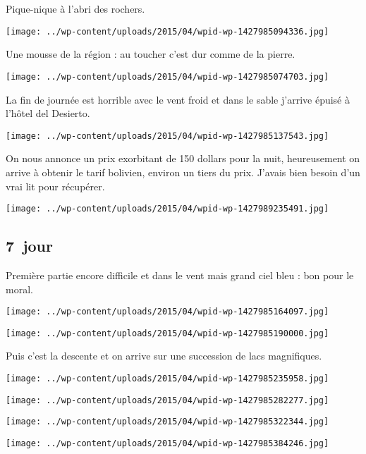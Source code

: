  Pique-nique à l'abri des rochers.
\begin{center} \texttt{[image: ../wp-content/uploads/2015/04/wpid-wp-1427985094336.jpg]} \end{center}

\pagebreak
 Une mousse de la région : au toucher c'est dur comme de la pierre.
\begin{center} \texttt{[image: ../wp-content/uploads/2015/04/wpid-wp-1427985074703.jpg]} \end{center}

 La fin de journée est horrible avec le vent froid et dans le sable j'arrive épuisé à l'hôtel del Desierto.
\begin{center} \texttt{[image: ../wp-content/uploads/2015/04/wpid-wp-1427985137543.jpg]} \end{center}

  On nous annonce un prix exorbitant de 150 dollars pour la nuit, heureusement on arrive à obtenir le tarif bolivien, environ un tiers du prix. J'avais bien besoin d'un vrai lit pour récupérer.
\begin{center} \texttt{[image: ../wp-content/uploads/2015/04/wpid-wp-1427989235491.jpg]} \end{center}

 \subsection*{7\ieme\ jour} 

 Première partie encore difficile et dans le vent mais grand ciel bleu : bon pour le moral.
\begin{center} \texttt{[image: ../wp-content/uploads/2015/04/wpid-wp-1427985164097.jpg]} \end{center}
\begin{center} \texttt{[image: ../wp-content/uploads/2015/04/wpid-wp-1427985190000.jpg]} \end{center}

  Puis c'est la descente et on arrive sur une succession de lacs magnifiques.
\begin{center} \texttt{[image: ../wp-content/uploads/2015/04/wpid-wp-1427985235958.jpg]} \end{center}
\begin{center} \texttt{[image: ../wp-content/uploads/2015/04/wpid-wp-1427985282277.jpg]} \end{center}
\begin{center} \texttt{[image: ../wp-content/uploads/2015/04/wpid-wp-1427985322344.jpg]} \end{center}
\begin{center} \texttt{[image: ../wp-content/uploads/2015/04/wpid-wp-1427985384246.jpg]} \end{center}

